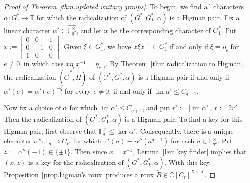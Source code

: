 \documentclass[11pt]{article}
\theoremstyle{definition}
\numberwithin{equation}{section}
\begin{document}
\begin{proof}[Proof of Theorem~\ref{thm.updated unitary groups}]
To begin, we find all characters $\alpha \colon G_1^* \to \mathbb{T}$ for which the radicalization of $(G^*, G_1^*, \alpha)$ is a Higman pair.
Fix a linear character $\alpha' \in \widehat{ \mathbb{F}_{q^2}^\times }$, and let $\alpha$ be the corresponding character of $G_1^*$.
Put $x := \begin{bmatrix} 0 & 0 & 1 \\ 0 & -1 & 0 \\ 1 & 0 & 0 \end{bmatrix}$.
Given $\xi \in G_1^*$, we have $x \xi x^{-1} \in G_1^*$ if and only if $\xi = \eta_e$ for $e \neq 0$, in which case $x \eta_e x^{-1} = \eta_{e^{-q}}$.
By Theorem~\ref{thm.radicalization to Higman}, the radicalization $(\widetilde{G}^*,H)$ of $(G^*, G_1^*, \alpha)$ is a Higman pair if and only if $\alpha'(e) = \alpha'(e)^{-q}$ for every $e \neq 0$, if and only if $\operatorname{im} \alpha' \leq C_{q+1}$.

Now fix a choice of $\alpha$ for which $\operatorname{im}\alpha'\leq C_{q+1}$, and put $r':=|\operatorname{im}\alpha'|$, $r:=2r'$.
Then the radicalization of $(G^*,G_1^*,\alpha)$ is a Higman pair.
To find a key for this Higman pair, first observe that $\mathbb{F}_q^\times \leq \operatorname{ker}\alpha'$.
Consequently, there is a unique character $\alpha''\colon\mathbb{T}_q\to C_{r'}$ for which $\alpha'(a)=\alpha''(a^{q-1})$ for each $a\in\mathbb{F}_{q^2}^\times$.
Put $z:=\alpha''(-1)\in\{\pm1\}$.
Then since $x=x^{-1}$, Lemma~\ref{lem.key finder} implies that $(x,z)$ is a key for the radicalization of $(G^*,G_1^*,\alpha)$.
With this key, Proposition~\ref{prop.higman's roux} produces a roux $\tilde{B}\in\mathbb{C}[C_r]^{X\times X}$.


\end{proof}
\end{document}
